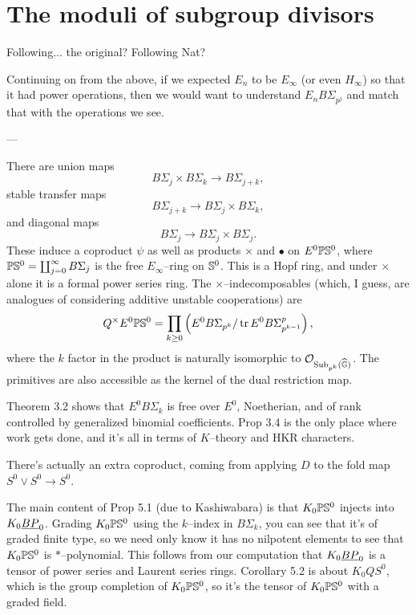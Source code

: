 




\section{The moduli of subgroup divisors}

Following... the original? Following Nat?

Continuing on from the above, if we expected $E_n$ to be $E_\infty$ (or even $H_\infty$) so that it had power operations, then we would want to understand $E_n B\Sigma_{p^j}$ and match that with the operations we see.

---

There are union maps \[B\Sigma_j \times B\Sigma_k \to B\Sigma_{j+k},\] stable transfer maps \[B\Sigma_{j+k} \to B\Sigma_j \times B\Sigma_k,\] and diagonal maps \[B\Sigma_j \to B\Sigma_j \times B\Sigma_j.\]  These induce a coproduct $\psi$ as well as products $\times$ and $\bullet$ on $E^0 \P \S^0$, where $\P\S^0 = \coprod_{j=0}^\infty B\Sigma_j$ is the free $E_\infty$--ring on $\S^0$.  This is a Hopf ring, and under $\times$ alone it is a formal power series ring.  The $\times$--indecomposables (which, I guess, are analogues of considering additive unstable cooperations) are \[Q^\times E^0 \P\S^0 = \prod_{k \ge 0} \left( E^0 B\Sigma_{p^k} / \operatorname{tr} E^0 B\Sigma_{p^{k-1}}^p \right),\] where the $k${\th} factor in the product is naturally isomorphic to $\sheaf{O}_{\Sub_{p^k}(\G)}$.  The primitives are also accessible as the kernel of the dual restriction map.

Theorem 3.2 shows that $E^0 B\Sigma_k$ is free over $E^0$, Noetherian, and of rank controlled by generalized binomial coefficients.  Prop 3.4 is the only place where work gets done, and it's all in terms of $K$--theory and HKR characters.

There's actually an extra coproduct, coming from applying $D$ to the fold map $S^0 \vee S^0 \to S^0$.

The main content of Prop 5.1 (due to Kashiwabara) is that $K_0 \P \S^0$ injects into $K_0 \OS{BP}{0}$.  Grading $K_0 \P \S^0$ using the $k$--index in $B\Sigma_k$, you can see that it's of graded finite type, so we need only know it has no nilpotent elements to see that $K_0 \P \S^0$ is $\ast$--polynomial.  This follows from our computation that $K_0 \OS{BP}{0}$ is a tensor of power series and Laurent series rings.  Corollary 5.2 is about $K_0 Q S^0$, which is the group completion of $K_0 \P \S^0$, so it's the tensor of $K_0 \P \S^0$ with a graded field.

